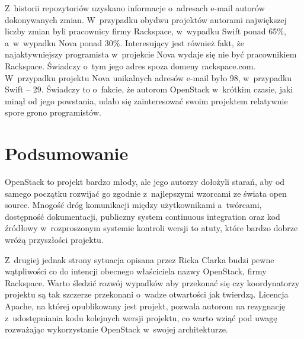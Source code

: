 	Z~historii repozytoriów uzyskano informacje o~adresach e-mail autorów
	dokonywanych zmian. W~przypadku obydwu projektów autorami największej liczby
	zmian byli pracownicy firmy Rackspace, w~wypadku Swift ponad 65\%,
	a~w~wypadku Nova ponad 30\%. Interesujący jest również fakt, że
	najaktywniejszy programista w~projekcie Nova wydaje się nie być pracownikiem
	Rackspace. Świadczy o~tym jego adres spoza domeny rackspace.com.
	W~przypadku projektu Nova unikalnych adresów e-mail było 98, w~przypadku
	Swift -- 29. Świadczy to o~fakcie, że autorom OpenStack w~krótkim
	czasie, jaki minął od jego powstania, udało się zainteresować swoim
	projektem relatywnie spore grono programistów.

	\section{Podsumowanie}

	OpenStack to projekt bardzo młody, ale jego autorzy dołożyli starań, aby od
	samego początku rozwijać go zgodnie z~najlepszymi wzorcami ze świata open
	source. Mnogość dróg komunikacji między użytkownikami a~twórcami,
	dostępność dokumentacji, publiczny system continuous integration oraz kod
	źródłowy w~rozproszonym systemie kontroli wersji to atuty, które bardzo
	dobrze wróżą przyszłości projektu.

	Z~drugiej jednak strony sytuacja opisana przez Ricka Clarka budzi pewne
	wątpliwości co do intencji obecnego właściciela nazwy OpenStack, firmy
	Rackspace. Warto śledzić rozwój wypadków aby przekonać się czy koordynatorzy
	projektu są tak szczerze przekonani o~wadze otwartości jak twierdzą.
	Licencja Apache, na której opublikowany jest projekt, pozwala autorom na
	rezygnację z~udostępniania kodu kolejnych wersji projektu, co warto wziąć
	pod uwagę rozważając wykorzystanie OpenStack w~swojej architekturze.

	
	


